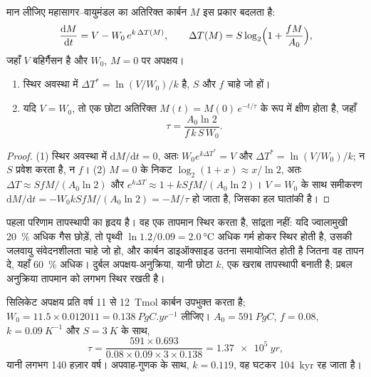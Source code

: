 \begin{proposition}[तापस्थापी की स्थिर अवस्था और काल-नियतांक]\label{prop:b2:deep-time-climate:thermostat}
मान लीजिए महासागर--वायुमंडल का अतिरिक्त कार्बन $M$ इस प्रकार बदलता है:
\[
  \frac{\mathrm dM}{\mathrm dt} = V - W_0\,e^{k\,\Delta T(M)}, \qquad
  \Delta T(M) = S\log_2\Bigl(1 + \frac{fM}{A_0}\Bigr),
\]
जहाँ $V$ बहिर्गैसन है और $W_0$, $M = 0$ पर अपक्षय।
\begin{enumerate}
  \item स्थिर अवस्था में $\Delta T^* = \ln(V/W_0)/k$ है, $S$ और $f$ चाहे जो हों।
  \item यदि $V = W_0$, तो एक छोटा अतिरिक्त $M(t) = M(0)\,e^{-t/\tau}$ के रूप में क्षीण होता है, जहाँ
        \[
          \tau = \frac{A_0 \ln 2}{f\,k\,S\,W_0} .
        \]
\end{enumerate}
\end{proposition}

\begin{proof}
(1) स्थिर अवस्था में $\mathrm dM/\mathrm dt = 0$, अतः $W_0e^{k\Delta T^*} = V$ और $\Delta T^* =
\ln(V/W_0)/k$; न $S$ प्रवेश करता है, न $f$। (2) $M = 0$ के निकट $\log_2(1 + x) \approx x/\ln 2$, अतः
$\Delta T \approx SfM/(A_0\ln 2)$ और $e^{k\Delta T} \approx 1 + kSfM/(A_0\ln2)$। $V = W_0$ के साथ
समीकरण $\mathrm dM/\mathrm dt = -W_0kSfM/(A_0\ln 2) = -M/\tau$ हो जाता है, जिसका हल
घातांकी है।
\end{proof}

पहला परिणाम तापस्थापी का हृदय है। वह एक तापमान स्थिर करता है, सांद्रता नहीं: यदि
ज्वालामुखी \qty{20}{\percent} अधिक गैस छोड़ें, तो पृथ्वी $\ln 1.2/0.09 = \qty{2.0}{\celsius}$
अधिक गर्म होकर स्थिर होती है, उसकी जलवायु संवेदनशीलता चाहे जो हो, और कार्बन डाइऑक्साइड उतना समायोजित होती है जितना वह
तापन दे, यहाँ \qty{60}{\percent} अधिक। दुर्बल अपक्षय-अनुक्रिया, यानी छोटा $k$, एक खराब
तापस्थापी बनाती है; प्रबल अनुक्रिया तापमान को लगभग स्थिर रखती है।

\begin{example}[तापस्थापी का काल-नियतांक]\label{ex:b2:deep-time-climate:tau}
सिलिकेट अपक्षय प्रति वर्ष 11 से \qty{12}{Tmol} कार्बन उपभुक्त करता है; $W_0 = 11.5\times0.012011
= \qty{0.138}{PgC.yr^{-1}}$ लीजिए। $A_0 = \qty{591}{PgC}$, $f = 0.08$, $k = \qty{0.09}{K^{-1}}$ और
$S = \qty{3}{K}$ के साथ,
\[
  \tau = \frac{591\times0.693}{0.08\times0.09\times3\times0.138} = \qty{1.37e5}{yr} ,
\]
यानी लगभग 140 हज़ार वर्ष। अपवाह-गुणक के साथ, $k = 0.119$, वह घटकर
\qty{104}{kyr} रह जाता है।
\end{example}

